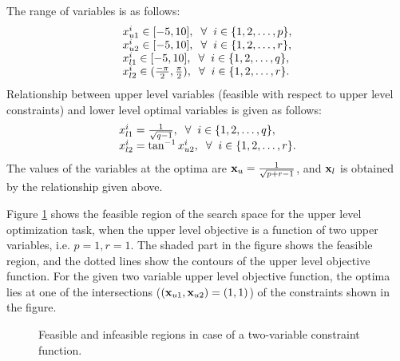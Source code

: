 \documentclass[twoside]{article}
\begin{document}
The range of variables is as follows:
\begin{equation}
\begin{array}{l}
x_{u1}^{i} \in [-5,10], \hspace{2mm} \forall \hspace{2mm} i \in \{1,2,\ldots,p\},\\
x_{u2}^{i} \in [-5,10], \hspace{2mm} \forall \hspace{2mm} i \in \{1,2,\ldots,r\},\\
x_{l1}^{i} \in [-5,10], \hspace{2mm} \forall \hspace{2mm} i \in \{1,2,\ldots,q\},\\
x_{l2}^{i} \in (\frac{-\pi}{2},\frac{\pi}{2}), \hspace{2mm} \forall \hspace{2mm} i \in \{1,2,\ldots,r\}.
\end{array}
\end{equation}
Relationship between upper level variables (feasible with respect to upper level constraints) and lower level optimal variables is given as follows:
\begin{equation}
\begin{array}{l}
x_{l1}^{i} = \frac{1}{\sqrt{q-1}}, \hspace{2mm} \forall \hspace{2mm} i \in \{1,2,\ldots,q\},\\
x_{l2}^{i} = \tan^{-1} x_{u2}^{i}, \hspace{2mm} \forall \hspace{2mm} i \in \{1,2,\ldots,r\}.
\end{array}
\end{equation}
The values of the variables at the optima are $\mbox{$\mathbf{x}$}_u=\frac{1}{\sqrt{p+r-1}}$, and $\mbox{$\mathbf{x}$}_l$ is obtained by the relationship given above.

Figure \ref{fig:cubicConst} shows the feasible region of the search space for the upper level optimization task, when the upper level objective is a function of two upper variables, i.e. $p=1, r=1$. The shaded part in the figure shows the feasible region, and the dotted lines show the contours of the upper level objective function. For the given two variable upper level objective function, the optima lies at one of the intersections ($(\mbox{$\mathbf{x}$}_{u1}, \mbox{$\mathbf{x}$}_{u2})=(1,1)$) of the constraints shown in the figure.

\begin{figure}
\begin{center}
\caption{Feasible and infeasible regions in case of a two-variable constraint function.}
\label{fig:cubicConst}
\end{center}
\end{figure}
\end{document}
